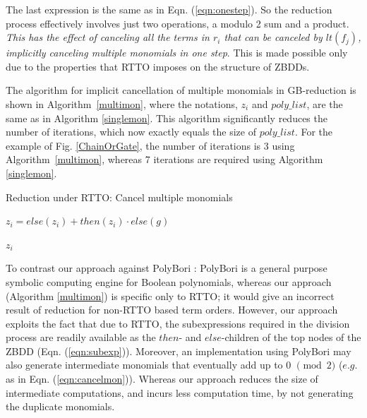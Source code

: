 \par The last expression is the same as in
Eqn. (\ref{eqn:onestep}). So the reduction process effectively
involves just two operations, a modulo 2 sum and a product. {\it This
  has the effect of canceling all the terms in $r_i$ that can be
  canceled by $lt(f_j)$,  implicitly canceling multiple monomials in
  one step}.  This is made possible only due to the properties that
RTTO imposes on the structure of ZBDDs. 

The algorithm for implicit cancellation of multiple monomials in
GB-reduction is shown in Algorithm~\ref{multimon}, where the notations,
$z_i$ and $poly\_list$, are the same as in Algorithm
\ref{singlemon}. This algorithm significantly
reduces the number of iterations, which now exactly equals the size of
$poly\_list$. For the example of Fig. \ref{ChainOrGate}, the number of
iterations is 3 using Algorithm~\ref{multimon}, whereas 7 iterations
are required using Algorithm \ref{singlemon}.


\begin{algorithm}
\caption{Reduction under RTTO: Cancel multiple monomials}
\label{multimon}
\begin{algorithmic}[1]
{\small
{}

\State $z_i = else(z_i) + then(z_i)\cdot else(g)$
\EndIf

\EndFor
\State \Return $z_i$
\EndProcedure
}
\end{algorithmic}
\end{algorithm}


   

To contrast our approach against PolyBori \cite{polybori:2009}:
PolyBori is a general purpose symbolic computing engine for Boolean
polynomials, whereas our approach (Algorithm
\ref{multimon}) is specific only to RTTO; it would give an incorrect
result of reduction for non-RTTO based term orders. However, our
approach exploits the fact that due to RTTO, the subexpressions
required in the division process are readily
available as the $then$- and $else$-children of the top nodes of the
ZBDD (Eqn. (\ref{eqn:subexp})). Moreover, an implementation using
PolyBori may also generate intermediate monomials that eventually add
up to 0 $\pmod 2$  ($e.g.$ as in Eqn. (\ref{eqn:cancelmon})). Whereas
our approach reduces the size of intermediate computations, and incurs
less computation time, by not generating the duplicate monomials. 


